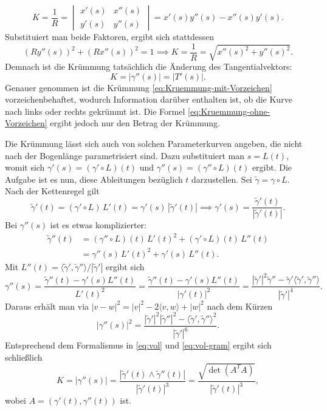 \begin{equation}\label{eq:Kruemmung-mit-Vorzeichen}
K = \frac{1}{R} =
\begin{vmatrix}
x'(s) & x''(s)\\
y'(s) & y''(s)
\end{vmatrix}
= x'(s)y''(s)-x''(s)y'(s).
\end{equation}
Substituiert man beide Faktoren, ergibt sich stattdessen
\begin{equation}
(Ry''(s))^2+(Rx''(s))^2 = 1
\implies K = \frac{1}{R} = \sqrt{x''(s)^2+y''(s)^2}.
\end{equation}
Demnach ist die Krümmung tatsächlich die Änderung des
Tangentialvektors:
\begin{equation}\label{eq:Kruemmung-ohne-Vorzeichen}
K = |\gamma''(s)| = |T'(s)|.
\end{equation}
Genauer genommen ist die Krümmung \eqref{eq:Kruemmung-mit-Vorzeichen}
vorzeichenbehaftet, wodurch Information darüber enthalten ist, ob
die Kurve nach links oder rechts gekrümmt ist. Die Formel
\eqref{eq:Kruemmung-ohne-Vorzeichen} ergibt jedoch nur den Betrag
der Krümmung.

Die Krümmung lässt sich auch von solchen Parameterkurven angeben,
die nicht nach der Bogenlänge parametrisiert sind. Dazu substituiert
man $s=L(t)$, womit sich $\gamma'(s) = (\gamma'\circ L)(t)$ und
$\gamma''(s)=(\gamma''\circ L)(t)$ ergibt. Die Aufgabe ist es nun, diese
Ableitungen bezüglich $t$ darzustellen. Sei $\tilde\gamma = \gamma\circ L$.
Nach der Kettenregel gilt%
\begin{equation}
\tilde\gamma'(t) = (\gamma'\circ L)\,L'(t) = \gamma'(s)\,|\tilde\gamma'(t)|
\implies \gamma'(s) = \frac{\tilde\gamma'(t)}{|\tilde\gamma'(t)|}.
\end{equation}
Bei $\gamma''(s)$ ist es etwas komplizierter:
\begin{align}
\tilde\gamma''(t)
&= (\gamma''{\circ}L)(t)\,L'(t)^2+(\gamma'{\circ}L)(t)\,L''(t)\\
&= \gamma''(s)\,L'(t)^2+\gamma'(s)\,L''(t).
\end{align}
Mit $L''(t)=\langle\tilde\gamma',\tilde\gamma''\rangle/|\tilde\gamma'|$
ergibt sich
\begin{equation}
\gamma''(s) = \frac{\tilde\gamma''(t)-\gamma'(s)L''(t)}{L'(t)^2}
= \frac{\tilde\gamma''(t)-\gamma'(s)L''(t)}{|\gamma'(t)|^2}
= \frac{
|\tilde\gamma'|^2\tilde\gamma''
-\tilde\gamma'\langle\tilde\gamma',\tilde\gamma''\rangle
}{|\tilde\gamma'|^4}.
\end{equation}
Daraus erhält man via $|v-w|^2 = |v|^2-2\langle v,w\rangle+|w|^2$ nach
dem Kürzen
\begin{equation}
|\gamma''(s)|^2 = \frac{
|\tilde\gamma'|^2|\tilde\gamma''|^2
-\langle\tilde\gamma',\tilde\gamma''\rangle^2
}{|\tilde\gamma'|^6}.
\end{equation}
Entsprechend dem Formalismus in \eqref{eq:vol} und \eqref{eq:vol-gram}
ergibt sich schließlich
\begin{equation}\label{eq:Kruemmung-t}
K = |\gamma''(s)| = \frac{|\tilde\gamma'(t)\wedge\tilde\gamma''(t)|}{|\tilde\gamma'(t)|^3}
= \frac{\sqrt{\det(A^T A)}}{|\tilde\gamma'(t)|^3},
\end{equation}
wobei $A=(\gamma'(t),\gamma''(t))$ ist.

